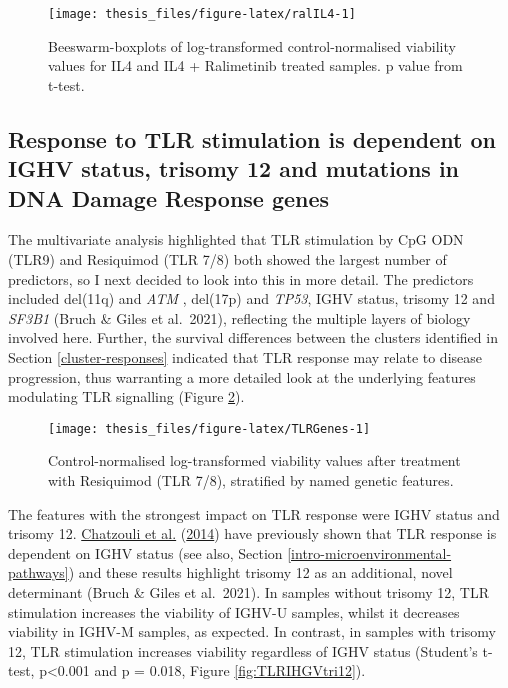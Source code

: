 \documentclass[11pt, a4paper, twosided]{book}
\begin{document}
\begin{figure}

{\centering \texttt{[image: thesis\_files/figure-latex/ralIL4-1]} 

}

\caption{Beeswarm-boxplots of log-transformed control-normalised viability values for IL4 and IL4 + Ralimetinib treated samples. p value from t-test.}\label{fig:ralIL4}
\end{figure}
\hypertarget{response-to-tlr-stimulation-is-dependent-on-ighv-status-trisomy-12-and-mutations-in-dna-damage-response-genes}{%
\subsection{Response to TLR stimulation is dependent on IGHV status, trisomy 12 and mutations in DNA Damage Response genes}\label{response-to-tlr-stimulation-is-dependent-on-ighv-status-trisomy-12-and-mutations-in-dna-damage-response-genes}}

The multivariate analysis highlighted that TLR stimulation by CpG ODN (TLR9) and Resiquimod (TLR 7/8) both showed the largest number of predictors, so I next decided to look into this in more detail. The predictors included del(11q) and \emph{ATM} , del(17p) and \emph{TP53}, IGHV status, trisomy 12 and \emph{SF3B1} (Bruch \& Giles et al.~2021), reflecting the multiple layers of biology involved here. Further, the survival differences between the clusters identified in Section \ref{cluster-responses} indicated that TLR response may relate to disease progression, thus warranting a more detailed look at the underlying features modulating TLR signalling (Figure \ref{fig:TLRGenes}).


\begin{figure}

{\centering \texttt{[image: thesis\_files/figure-latex/TLRGenes-1]} 

}

\caption{Control-normalised log-transformed viability values after treatment with Resiquimod (TLR 7/8), stratified by named genetic features.}\label{fig:TLRGenes}
\end{figure}
The features with the strongest impact on TLR response were IGHV status and trisomy 12. \protect\hyperlink{ref-Chatzouli2014}{Chatzouli et al.} (\protect\hyperlink{ref-Chatzouli2014}{2014}) have previously shown that TLR response is dependent on IGHV status (see also, Section \ref{intro-microenvironmental-pathways}) and these results highlight trisomy 12 as an additional, novel determinant (Bruch \& Giles et al.~2021). In samples without trisomy 12, TLR stimulation increases the viability of IGHV-U samples, whilst it decreases viability in IGHV-M samples, as expected. In contrast, in samples with trisomy 12, TLR stimulation increases viability regardless of IGHV status (Student's t-test, p\textless0.001 and p = 0.018, Figure \ref{fig:TLRIHGVtri12}).
\end{document}
